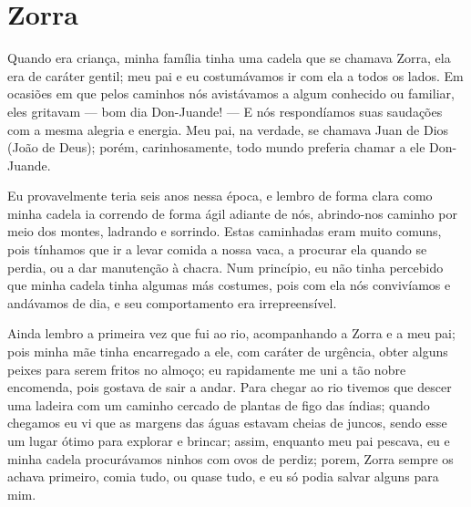 
\chapter{Zorra}
Quando era criança, minha família tinha uma cadela que se chamava Zorra, ela era de caráter gentil; meu pai e eu costumávamos ir com ela a todos os lados. Em ocasiões em que pelos caminhos nós avistávamos a algum conhecido ou familiar, eles gritavam --- bom dia Don-Juande! --- E nós respondíamos suas saudações com a mesma alegria e energia.
Meu pai, na verdade, se chamava Juan de Dios (João de Deus); porém, carinhosamente, todo mundo preferia chamar a ele Don-Juande.

Eu provavelmente teria seis anos nessa época, e lembro de forma clara como minha cadela ia correndo de forma ágil adiante de nós, abrindo-nos caminho por meio dos montes, ladrando e sorrindo.
Estas caminhadas eram muito comuns, pois tínhamos que ir a levar comida a nossa vaca, a procurar ela quando se perdia, ou a dar manutenção à chacra.
Num princípio, eu não tinha percebido que minha cadela tinha algumas más costumes, pois com ela nós convivíamos e andávamos de dia, e seu comportamento era irrepreensível. 

Ainda lembro a primeira vez que fui ao rio, acompanhando a Zorra e a meu pai; pois minha mãe tinha encarregado a ele, com caráter de urgência, obter alguns peixes para serem fritos no almoço; eu rapidamente me uni a tão nobre encomenda, pois gostava de sair a andar. 
Para chegar ao rio tivemos que descer uma ladeira com um caminho cercado de plantas de figo das índias; quando chegamos eu vi que as margens das águas estavam cheias de juncos, sendo esse um lugar ótimo para explorar e brincar; assim, enquanto meu pai pescava, eu e minha cadela procurávamos ninhos com ovos de perdiz; porem, Zorra sempre os achava primeiro, comia tudo, ou quase tudo, e eu só podia salvar alguns para mim.


